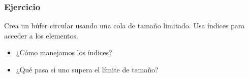 \documentclass[11pt]{beamer}
\begin{document}
\begin{frame}\frametitle{Ejercicio}
\begin{block}{}
\Huge\centering Crea un búfer circular usando una cola de tamaño limitado. Usa índices para acceder a los elementos.
\end{block}
\begin{itemize}
\item ¿Cómo manejamos los índices?
\item ¿Qué pasa si uno supera el límite de tamaño?
\end{itemize}
\end{frame}
\end{document}
